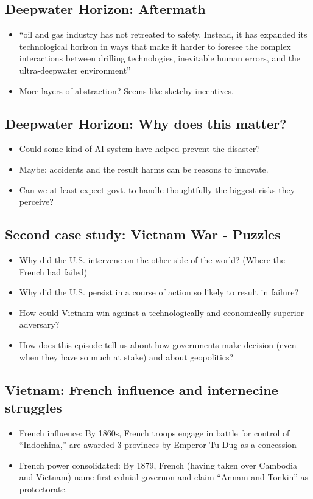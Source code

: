 \documentclass{article}
\begin{document}
\subsection{Deepwater Horizon: Aftermath}
\begin{itemize}
  \item ``oil and gas industry has not retreated to safety.  Instead, it has expanded its technological horizon in ways that make it harder to foresee the complex interactions between drilling technologies, inevitable human errors, and the ultra-deepwater environment''
  \item More layers of abstraction?  Seems like sketchy incentives.
\end{itemize}

\subsection{Deepwater Horizon: Why does this matter?}
\begin{itemize}
  \item Could some kind of AI system have helped prevent the disaster?
  \item Maybe: accidents and the result harms can be reasons to innovate.
  \item Can we at least expect govt. to handle thoughtfully the biggest risks they perceive?
\end{itemize}

\subsection{Second case study: Vietnam War - Puzzles}
\begin{itemize}
  \item Why did the U.S. intervene on the other side of the world? (Where the French had failed)
  \item Why did the U.S. persist in a course of action so likely to result in failure?
  \item How could Vietnam win against a technologically and economically superior adversary?
  \item How does this episode tell us about how governments make decision (even when they have so much at stake) and about geopolitics?
\end{itemize}

\subsection{Vietnam: French influence and internecine struggles}
\begin{itemize}
  \item French influence: By 1860s, French troops engage in battle for control of ``Indochina,'' are awarded 3 provinces by Emperor Tu Dug as a concession
  \item French power consolidated: By 1879, French (having taken over Cambodia and Vietnam) name first colnial governon and claim ``Annam and Tonkin'' as protectorate.
\end{itemize}
\end{document}
